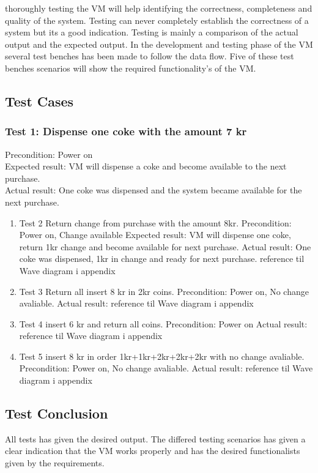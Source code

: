 thoroughly testing the VM will help identifying the correctness, completeness and quality of the system. Testing can never completely establish the correctness of a system but its a good indication. Testing is mainly a comparison of the actual output and the expected output.
In the development and testing phase of the VM several test benches has been made to follow the data flow. Five of these test benches scenarios will show the required functionality's of the VM.   

\subsection{Test Cases}
\subsubsection*{Test 1:  Dispense one coke with the amount 7 kr }

Precondition: Power on\\
Expected result: VM will dispense a coke and become available to the next purchase.\\
Actual result: One coke was dispensed and the system became available for the next purchase.\\

\begin{enumerate}

\item Test 2 Return change from purchase with the amount 8kr.
Precondition:  Power on, Change available 
Expected result:  VM will dispense one coke, return 1kr change and become available for next purchase.
Actual result: One coke was dispensed, 1kr in change and ready for next purchase.
reference til Wave diagram i appendix

\item Test 3 Return all insert 8 kr in 2kr coins.
Precondition:  Power on, No change avaliable.
Actual result: 
reference til Wave diagram i appendix

\item Test 4 insert 6 kr and return all coins. 
Precondition:  Power on
Actual result: 
reference til Wave diagram i appendix

\item Test 5 insert 8 kr in order 1kr+1kr+2kr+2kr+2kr with no change avaliable.
Precondition:  Power on, No change avaliable.
Actual result: 
reference til Wave diagram i appendix

\end{enumerate}

\subsection{Test Conclusion}
All tests has given the desired output. The differed testing scenarios has given a clear indication that the VM works properly and has the desired functionalists given by the requirements.
